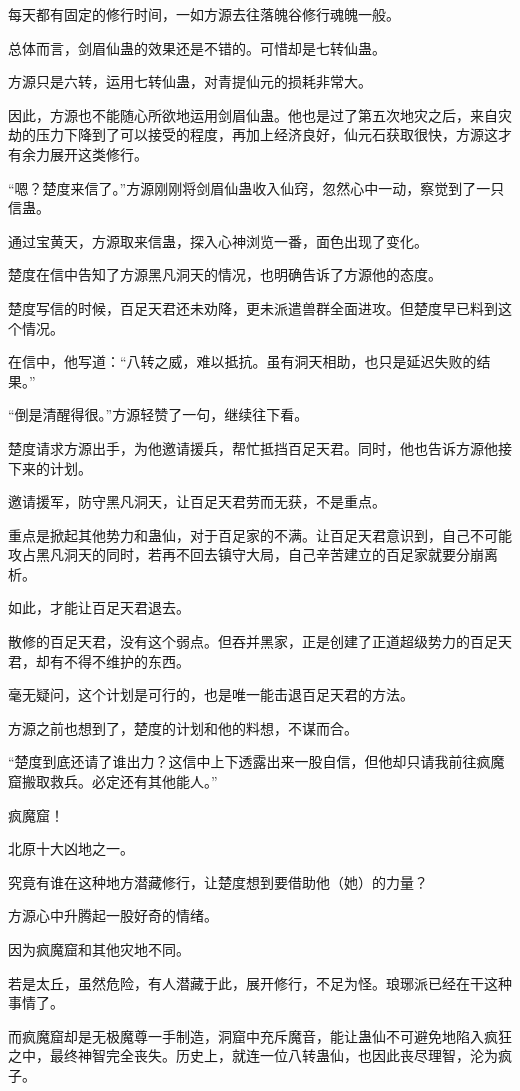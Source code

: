 \begin{this_body}
每天都有固定的修行时间，一如方源去往落魄谷修行魂魄一般。

总体而言，剑眉仙蛊的效果还是不错的。可惜却是七转仙蛊。

方源只是六转，运用七转仙蛊，对青提仙元的损耗非常大。

因此，方源也不能随心所欲地运用剑眉仙蛊。他也是过了第五次地灾之后，来自灾劫的压力下降到了可以接受的程度，再加上经济良好，仙元石获取很快，方源这才有余力展开这类修行。

“嗯？楚度来信了。”方源刚刚将剑眉仙蛊收入仙窍，忽然心中一动，察觉到了一只信蛊。

通过宝黄天，方源取来信蛊，探入心神浏览一番，面色出现了变化。

楚度在信中告知了方源黑凡洞天的情况，也明确告诉了方源他的态度。

楚度写信的时候，百足天君还未劝降，更未派遣兽群全面进攻。但楚度早已料到这个情况。

在信中，他写道：“八转之威，难以抵抗。虽有洞天相助，也只是延迟失败的结果。”

“倒是清醒得很。”方源轻赞了一句，继续往下看。

楚度请求方源出手，为他邀请援兵，帮忙抵挡百足天君。同时，他也告诉方源他接下来的计划。

邀请援军，防守黑凡洞天，让百足天君劳而无获，不是重点。

重点是掀起其他势力和蛊仙，对于百足家的不满。让百足天君意识到，自己不可能攻占黑凡洞天的同时，若再不回去镇守大局，自己辛苦建立的百足家就要分崩离析。

如此，才能让百足天君退去。

散修的百足天君，没有这个弱点。但吞并黑家，正是创建了正道超级势力的百足天君，却有不得不维护的东西。

毫无疑问，这个计划是可行的，也是唯一能击退百足天君的方法。

方源之前也想到了，楚度的计划和他的料想，不谋而合。

“楚度到底还请了谁出力？这信中上下透露出来一股自信，但他却只请我前往疯魔窟搬取救兵。必定还有其他能人。”

疯魔窟！

北原十大凶地之一。

究竟有谁在这种地方潜藏修行，让楚度想到要借助他（她）的力量？

方源心中升腾起一股好奇的情绪。

因为疯魔窟和其他灾地不同。

若是太丘，虽然危险，有人潜藏于此，展开修行，不足为怪。琅琊派已经在干这种事情了。

而疯魔窟却是无极魔尊一手制造，洞窟中充斥魔音，能让蛊仙不可避免地陷入疯狂之中，最终神智完全丧失。历史上，就连一位八转蛊仙，也因此丧尽理智，沦为疯子。

\end{this_body}

